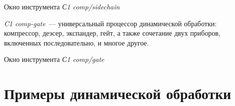 \documentclass{beamer}
\begin{document}
\begin{frame}
  \begin{block}{Окно инструмента \emph{С1 comp/sidechain}}
  \end{block}
\end{frame} 

\begin{frame}
\emph{C1 comp-gate}~--- универсальный процессор динамической обработки: компрессор, деэсер, экспандер, гейт, а также сочетание двух приборов, включенных последовательно, и многое другое. 

  \begin{block}{Окно инструмента \emph{С1 comp/gate}}
  \end{block}
\end{frame} 

\section{Примеры динамической обработки}
\end{document}
